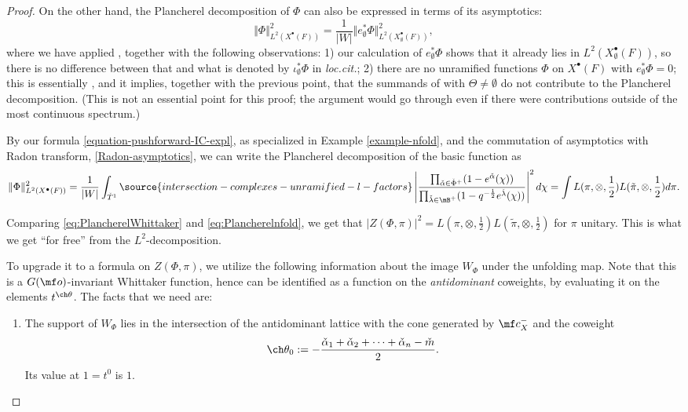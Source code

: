 \begin{proof}
 On the other hand, the Plancherel decomposition of $\Phi$ can also be expressed in terms of its asymptotics:
 \[ \Vert \Phi\Vert^2_{L^2(X^\bullet(F))} = \frac{1}{|W|} \Vert e_\emptyset^* \Phi\Vert^2_{L^2(X_\emptyset^\bullet(F))},
 \]
 where we have applied \cite[Theorem 7.3.1]{SV}, together with the following observations: 1) our calculation of $e_\emptyset^* \Phi$ shows that it already lies in $L^2(X_\emptyset^\bullet(F))$, so there is no difference between that and what is denoted by $\iota_\emptyset^* \Phi$ in \emph{loc.cit.}; 2) there are no unramified functions $\Phi$ on $X^\bullet(F)$ with $e_\emptyset^*\Phi = 0$; this is essentially \cite[Theorem 6.2.1]{SaSpc}, and it implies, together with the previous point, that the summands of \cite[Theorem 7.3.1]{SV} with $\Theta\ne \emptyset$ do not contribute to the Plancherel decomposition. (This is not an essential point for this proof; the argument would go through even if there were contributions outside of the most continuous spectrum.)


By our formula \eqref{equation-pushforward-IC-expl}, as specialized in Example \ref{example-nfold}, and the commutation of asymptotics with Radon transform, \eqref{Radon-asymptotics}, we can write the Plancherel decomposition of the basic function as
 \begin{equation}\label{eq:Plancherelnfold} \Vert \Phi\Vert^2_{L^2(X^\bullet(F))} = \frac{1}{|W|} \int_{\check T^1}
\source{intersection-complexes-unramified-l-factors}
\left|\frac{\prod_{\check\alpha\in\check\Phi^+} (1-e^{\check\alpha}(\chi))}{\prod_{\check\lambda \in \mB^+} (1-q^{-\frac{1}{2}} e^{\check\lambda}(\chi))}\right|^2 d\chi =
 \int L(\pi, \otimes, \frac{1}{2}) L(\tilde \pi, \otimes, \frac{1}{2})
 d\pi.
 \end{equation}

Comparing \eqref{eq:PlancherelWhittaker} and \eqref{eq:Plancherelnfold}, we get that $|Z(\Phi, \pi)|^2 = L(\pi, \otimes, \frac{1}{2}) L(\tilde\pi, \otimes, \frac{1}{2})$ for $\pi$ unitary. This is what we get ``for free'' from the $L^2$-decomposition.

To upgrade it to a formula on $Z(\Phi, \pi)$, we utilize the following information about the image $W_{\Phi}$ under the unfolding map. Note that this is a $G(\mf o)$-invariant Whittaker function, hence can be identified as a function on the \emph{antidominant} coweights, by evaluating it on the elements $t^{\ch\theta}$. The facts that we need are:

\begin{enumerate}
 \item The support of $W_{\Phi}$ lies in the intersection of the antidominant lattice with the cone generated by $\mf c_X^-$ and the coweight \[\ch\theta_0:= - \frac{\check\alpha_1+\check\alpha_2+\dots+\check\alpha_n - \check m}{2}.\]
 Its value at $1 = t^0$ is $1$.


\end{enumerate}
\end{proof}
